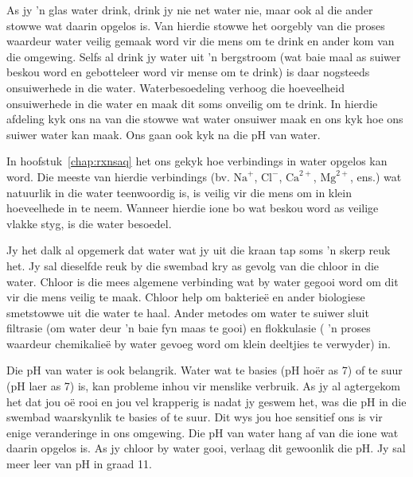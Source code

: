 As jy   'n glas water drink, drink jy nie net water nie, maar ook al die ander stowwe wat daarin opgelos is. Van hierdie stowwe het oorgebly van die proses waardeur water veilig gemaak word vir die mens om te drink en ander kom van die omgewing. Selfs al drink jy water uit   'n bergstroom (wat baie maal as suiwer beskou word en gebotteleer word vir mense om te drink) is daar nogsteeds onsuiwerhede in die water. Waterbesoedeling verhoog die hoeveelheid onsuiwerhede in die water en maak dit soms onveilig om te drink. In hierdie afdeling kyk ons na van die stowwe wat water onsuiwer maak en ons kyk hoe ons suiwer water kan maak. Ons gaan ook kyk na die pH van water.
\par 
\label{m38138*id08324}
In hoofstuk~\ref{chap:rxnsaq} het ons gekyk hoe verbindings in water opgelos kan word. Die meeste van hierdie verbindings (bv. ${\text{Na}}^{+}$, ${\text{Cl}}^{-}$, ${\text{Ca}}^{2+}$, ${\text{Mg}}^{2+}$, ens.) wat natuurlik in die water teenwoordig is, is veilig vir die mens om in klein hoeveelhede in te neem. Wanneer hierdie ione bo wat beskou word as veilige vlakke styg, is die water besoedel.
\par 
\label{m38138*id08322346}Jy het dalk al opgemerk dat water wat jy uit die kraan tap soms   'n skerp reuk het. Jy sal dieselfde reuk by die swembad kry as gevolg van die chloor in die water. Chloor is die mees algemene verbinding wat by water gegooi word om dit vir die mens veilig te maak. Chloor help om bakterie\"{e} en ander biologiese smetstowwe uit die water te haal. Ander metodes om water te suiwer sluit filtrasie (om water deur   'n baie fyn maas te gooi) en flokkulasie (  'n proses waardeur chemikalieë by water gevoeg word om klein deeltjies te verwyder) in.  
\par 
\label{m38138*id0832}
Die pH van water is ook belangrik. Water wat te basies (pH hoër as 7) of te suur (pH laer as 7) is, kan probleme inhou vir menslike verbruik. As jy al agtergekom het dat jou oë rooi en jou vel krapperig is nadat jy geswem het, was die pH in die swembad waarskynlik te basies of te suur. Dit wys jou hoe sensitief ons is vir enige veranderinge in ons omgewing. Die pH van water hang af van die ione wat daarin opgelos is. As jy chloor by water gooi, verlaag dit gewoonlik die pH. Jy sal meer leer van pH in graad 11.
\label{m38138*id08321}
